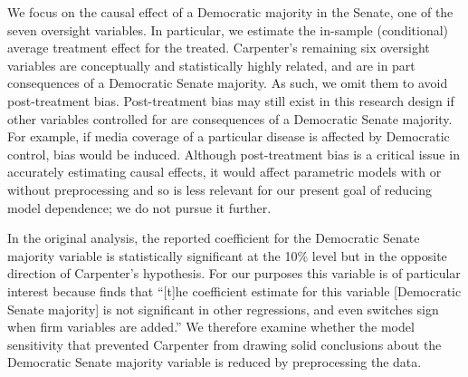 \documentclass[11pt,titlepage]{article}
\begin{document}
We focus on the causal effect of a Democratic majority in the Senate,
one of the seven oversight variables. In particular, we estimate the
in-sample (conditional) average treatment effect for the treated.
Carpenter's remaining six oversight variables are conceptually and
statistically highly related, and are in part consequences of a
Democratic Senate majority.  As such, we omit them to avoid
post-treatment bias.  Post-treatment bias may still exist in this
research design if other variables controlled for are consequences of
a Democratic Senate majority.  For example, if media coverage of a
particular disease is affected by Democratic control, bias would be
induced.  Although post-treatment bias is a critical issue in
accurately estimating causal effects, it would affect parametric
models with or without preprocessing and so is less relevant for our
present goal of reducing model dependence; we do not pursue it
further.


In the original analysis, the reported coefficient for the Democratic
Senate majority variable is statistically significant at the 10\%
level but in the opposite direction of Carpenter's hypothesis.  For
our purposes this variable is of particular interest because
\citet[p. 498]{Carpenter02} finds that ``[t]he coefficient estimate for
this variable [Democratic Senate majority] is not significant in other
regressions, and even switches sign when firm variables are added.''
We therefore examine whether the model sensitivity that prevented
Carpenter from drawing solid conclusions about the Democratic Senate
majority variable is reduced by preprocessing the data.
\end{document}
